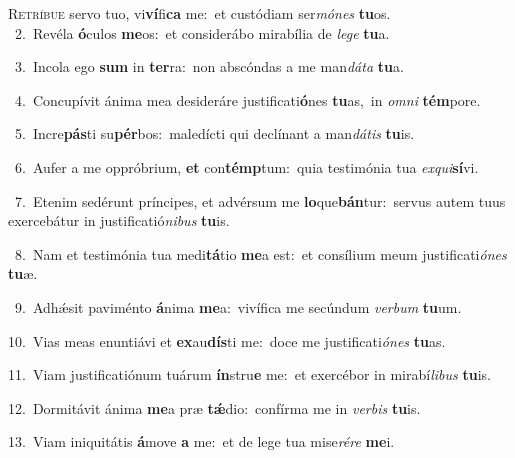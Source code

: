 \lettrine{\initial\textcolor{\initialcolor}{R}}{etríbue} servo tuo, vi\-\textbf{ví}\-fi\textbf{ca} me:~\star et custódiam ser\-\textit{mó}\-\textit{nes} \textbf{tu}\-os.\\
{\numbfont\textcolor{\numbcolor}{~2.}}~Revéla \textbf{ó}\-culos \textbf{me}\-os:~\star et considerábo mirabília de \textit{le}\-\textit{ge} \textbf{tu}\-a.\par
{\numbfont\textcolor{\numbcolor}{~3.}}~Incola ego \textbf{sum} in \textbf{ter}\-ra:~\star non abscóndas a me man\-\textit{dá}\-\textit{ta} \textbf{tu}\-a.\par
{\numbfont\textcolor{\numbcolor}{~4.}}~Concupívit ánima mea desideráre justificati\-\textbf{ó}\-nes \textbf{tu}\-as,~\star in \textit{om}\-\textit{ni} \textbf{tém}\-pore.\par
{\numbfont\textcolor{\numbcolor}{~5.}}~Incre\-\textbf{pás}\-ti su\-\textbf{pér}\-bos:~\star maledícti qui declínant a man\-\textit{dá}\-\textit{tis} \textbf{tu}\-is.\par
{\numbfont\textcolor{\numbcolor}{~6.}}~Aufer a me oppróbrium, \textbf{et} con\-\textbf{témp}\-tum:~\star quia testimónia tua \textit{ex}\-\textit{qui}\textbf{sí}vi.\par
{\numbfont\textcolor{\numbcolor}{~7.}}~Etenim sedérunt príncipes, et advérsum me \textbf{lo}\-que\-\textbf{bán}\-tur:~\star servus autem tuus exercebátur in justificatió\-\textit{ni}\-\textit{bus} \textbf{tu}\-is.\par
{\numbfont\textcolor{\numbcolor}{~8.}}~Nam et testimónia tua medi\-\textbf{tá}\-tio \textbf{me}\-a est:~\star et consílium meum justificati\-\textit{ó}\-\textit{nes} \textbf{tu}\-æ.\par
{\numbfont\textcolor{\numbcolor}{~9.}}~Adhǽsit paviménto \textbf{á}\-nima \textbf{me}\-a:~\star vivífica me secúndum \textit{ver}\-\textit{bum} \textbf{tu}\-um.\par
{\numbfont\textcolor{\numbcolor}{10.}}~Vias meas enuntiávi et \textbf{ex}\-au\-\textbf{dís}\-ti me:~\star doce me justificati\-\textit{ó}\-\textit{nes} \textbf{tu}\-as.\par
{\numbfont\textcolor{\numbcolor}{11.}}~Viam justificatiónum tuárum \textbf{ín}\-stru\textbf{e} me:~\star et exercébor in mirabí\-\textit{li}\-\textit{bus} \textbf{tu}\-is.\par
{\numbfont\textcolor{\numbcolor}{12.}}~Dormitávit ánima \textbf{me}\-a præ \textbf{tǽ}\-dio:~\star confírma me in \textit{ver}\-\textit{bis} \textbf{tu}\-is.\par
{\numbfont\textcolor{\numbcolor}{13.}}~Viam iniquitátis \textbf{á}\-move \textbf{a} me:~\star et de lege tua mise\-\textit{ré}\-\textit{re} \textbf{me}\-i.\par
